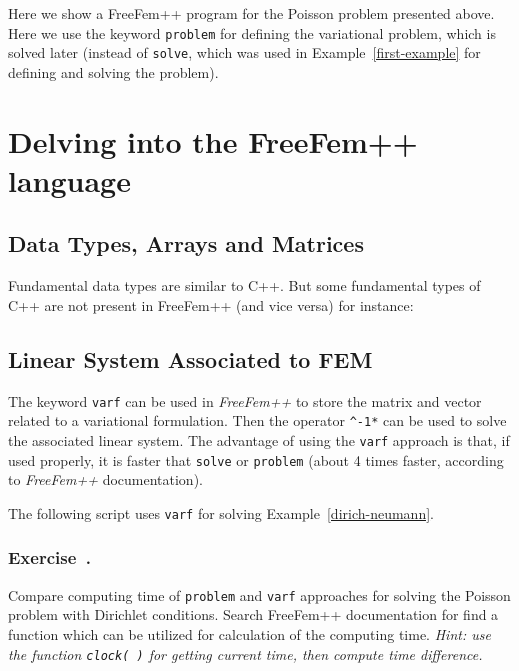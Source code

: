 \documentclass[12pt]{article}
\newcommand{\FF}{\textit{FreeFem++}\xspace}
\newcounter{exercise}
\newenvironment{exercise}{%
  \stepcounter{exercise}
  \subsubsection*{Exercise~\theexercise.}}
{}
\begin{document}
  Here we show a FreeFem++ program for the Poisson problem presented
  above.  Here we use the keyword \texttt{problem} for defining the
  variational problem, which is solved later (instead of
  \texttt{solve}, which was used in Example~\ref{first-example} for
  defining and solving the problem).



\section{Delving into the FreeFem++ language}
\label{sec:delv-into-freef}

\subsection{Data Types, Arrays and Matrices}
\label{sec:data-types-arrays}

Fundamental data types are similar to C++. But some fundamental types of C++ are not present in FreeFem++ (and vice versa) for instance:


\subsection{Linear System Associated to FEM}
\label{part:line-syst-assoc}

The keyword \texttt{varf} can be used in \FF to store the matrix and
vector related to a variational formulation. Then the operator
\verb|^-1*| can be used to solve the associated linear system.  The
advantage of using the \texttt{varf} approach is that, if used
properly, it is faster that \texttt{solve} or \texttt{problem} (about
4 times faster, according to \FF documentation).

The following script uses \texttt{varf} for solving Example~\ref{dirich-neumann}.



\begin{exercise}
  Compare computing time of \texttt{problem} and \texttt{varf}
  approaches for solving the Poisson problem with Dirichlet
  conditions.  Search FreeFem++ documentation for find a function
  which can be utilized for calculation of the computing
  time. \textit{Hint: use the function \texttt{clock(\ )} for getting
    current time, then compute time difference.}
\end{exercise}
\end{document}
